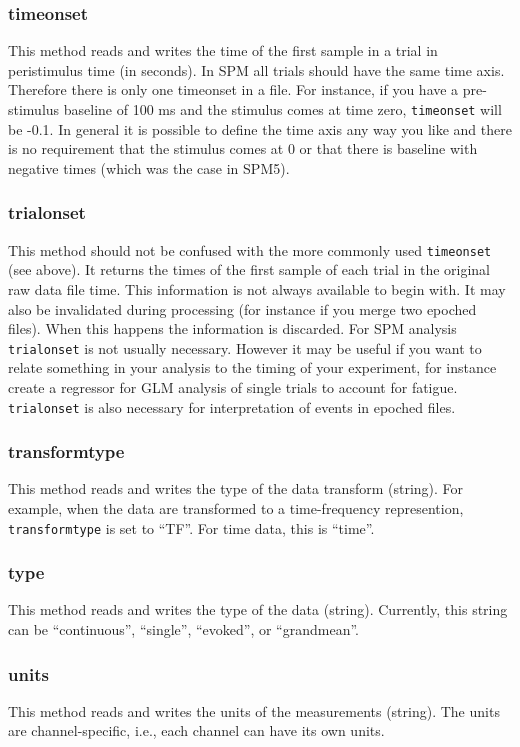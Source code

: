 \subsubsection{timeonset}
This method reads and writes the time of the first sample in a trial in peristimulus time (in seconds). In SPM all trials should have the same time axis. Therefore there is only one timeonset in a file. For instance, if you have a pre-stimulus baseline of 100 ms and the stimulus comes at time zero, \texttt{timeonset} will be -0.1. In general it is possible to define the time axis any way you like and there is no requirement that the stimulus comes at 0 or that there is baseline with negative times (which was the case in SPM5).

\subsubsection{trialonset}
This method should not be confused with the more commonly used \texttt{timeonset} (see above). It returns the times of the first sample of each trial in the original raw data file time. This information is not always available to begin with. It may also be invalidated during processing (for instance if you merge two epoched files). When this happens the information is discarded. For SPM analysis \texttt{trialonset} is not usually necessary. However it may be useful if you want to relate something in your analysis to the timing of your experiment, for instance create a regressor for GLM analysis of single trials to account for fatigue. \texttt{trialonset} is also necessary for interpretation of events in epoched files.

\subsubsection{transformtype}
This method reads and writes the type of the data transform (string). For example, when the data are transformed to a time-frequency represention, \texttt{transformtype} is set to ``TF''. For time data, this is ``time''.

\subsubsection{type}
This method reads and writes the type of the data (string). Currently, this string can be ``continuous'', ``single'', ``evoked'', or ``grandmean''.

\subsubsection{units}
This method reads and writes the units of the measurements (string). The units are channel-specific, i.e., each channel can have its own units.

